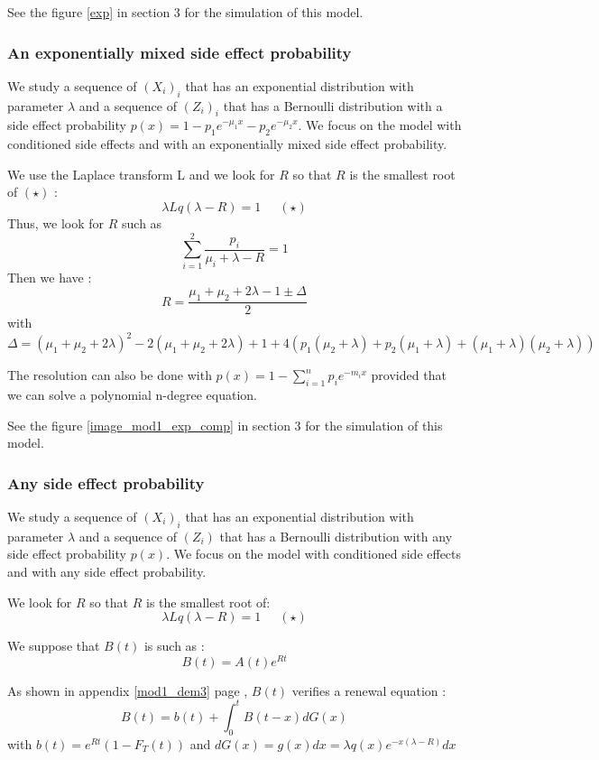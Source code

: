 \documentclass[12pt,twoside]{article}
\begin{document}
See the figure \ref{exp} in section 3 for the simulation of this model.

\subsubsection{An exponentially mixed side effect probability}
We study a sequence of $(X_i)_i$ that has an exponential distribution with parameter $\lambda$ and a sequence of $(Z_i)_i$ that has a Bernoulli distribution with a side effect probability $p(x)=1-p_1 e^{-\mu_1 x}-p_2 e^{-\mu_2 x}$. We focus on the model with conditioned side effects and with an exponentially mixed side effect probability.


We use the Laplace transform L and we look for $R$ so that $R$ is the smallest root of $(\star)$ : 
$$\lambda Lq(\lambda-R) = 1~~\quad(\star)$$  
Thus, we look for $R$  such as $$\sum_{i=1}^{2}\frac{p_i}{\mu_i+\lambda-R}=1$$
Then we have :
$$R=\frac{\mu_1+\mu_2+2\lambda-1 \pm \Delta}{2}$$
with $$\Delta=(\mu_1+\mu_2+2\lambda)^2-2(\mu_1+\mu_2+2\lambda)+1+4(p_1(\mu_2+\lambda)+p_2(\mu_1+\lambda)+(\mu_1+\lambda)(\mu_2+\lambda))$$


The resolution can also be done with $p(x)=1-\sum_{i=1}^{n}p_i e^{-m_i x}$ provided that we can solve a polynomial n-degree equation.

See the figure \ref{image_mod1_exp_comp} in section 3 for the simulation of this model.



\subsubsection{Any side effect probability}
We study a sequence of $(X_i)_i$ that has an exponential distribution with parameter $\lambda$ and a sequence of $(Z_i)$ that has a Bernoulli distribution with any side effect probability $p(x)$. We focus on the model with conditioned side effects and with any side effect probability.

We look for $R$ so that $R$ is the smallest root of: 
$$\lambda Lq(\lambda-R) = 1~~\quad(\star)$$

We suppose that $B(t)$ is such as :
$$B(t)=A(t)e^{Rt}$$

As shown in appendix \ref{mod1_dem3} page \pageref{mod1_dem3}, $B(t)$ verifies a renewal equation : \\
\begin{equation}
B(t)=b(t)+\int_0^t B(t-x)dG(x)
\label{renewal_eq}
\end{equation}
with $b(t)=e^{Rt}(1-F_T(t))$ and $dG(x) =g(x) dx =\lambda q(x) e^{-x(\lambda-R)}dx$
\end{document}
